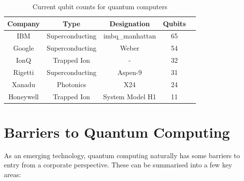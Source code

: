 \documentclass{article}
\theoremstyle{definition}
\begin{document}
\begin{table}[htb]
    \centering
    \begin{tabular}{ccccc}
         Company & Type & Designation & Qubits  \\
         \hline
        IBM & Superconducting & imbq\_manhattan & 65   \\
        Google & Superconducting & Weber & 54 \\
        IonQ & Trapped Ion & - & 32 \\
        Rigetti & Superconducting & Aspen-9 & 31 \\
        Xanadu & Photonics & X24 &  24 \\
        Honeywell & Trapped Ion & System Model H1 & 11 
    \end{tabular}
    \caption{Current qubit counts for quantum computers}
    \label{tab:qubit_counts}
\end{table}

\section{Barriers to Quantum Computing}
As an emerging technology, quantum computing naturally has some barriers to entry from a corporate perspective. These can be summarised into a few key areas:
\end{document}
